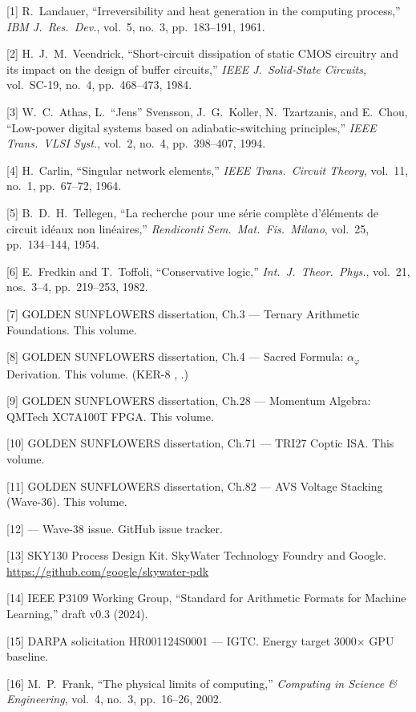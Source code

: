 [1] R.\ Landauer, ``Irreversibility and heat generation in the
computing process,'' \emph{IBM J.\ Res.\ Dev.}, vol.~5, no.~3,
pp.~183--191, 1961.

[2] H.\ J.\ M.\ Veendrick, ``Short-circuit dissipation of static
CMOS circuitry and its impact on the design of buffer circuits,''
\emph{IEEE J.\ Solid-State Circuits}, vol.~SC-19, no.~4,
pp.~468--473, 1984.

[3] W.\ C.\ Athas, L.\ ``Jens'' Svensson, J.\ G.\ Koller,
N.\ Tzartzanis, and E.\ Chou, ``Low-power digital systems based on
adiabatic-switching principles,'' \emph{IEEE Trans.\ VLSI Syst.},
vol.~2, no.~4, pp.~398--407, 1994.

[4] H.\ Carlin, ``Singular network elements,'' \emph{IEEE Trans.\
Circuit Theory}, vol.~11, no.~1, pp.~67--72, 1964.

[5] B.\ D.\ H.\ Tellegen, ``La recherche pour une s\'erie compl\`ete
d'\'el\'ements de circuit id\'eaux non lin\'eaires,''
\emph{Rendiconti Sem.\ Mat.\ Fis.\ Milano}, vol.~25, pp.~134--144,
1954.

[6] E.\ Fredkin and T.\ Toffoli, ``Conservative logic,''
\emph{Int.\ J.\ Theor.\ Phys.}, vol.~21, nos.~3--4, pp.~219--253,
1982.

[7] GOLDEN SUNFLOWERS dissertation, Ch.3 --- Ternary Arithmetic
Foundations. This volume.

[8] GOLDEN SUNFLOWERS dissertation, Ch.4 --- Sacred Formula:
\(\alpha_\varphi\) Derivation. This volume. (KER-8
, .)

[9] GOLDEN SUNFLOWERS dissertation, Ch.28 --- Momentum Algebra:
QMTech XC7A100T FPGA. This volume.

[10] GOLDEN SUNFLOWERS dissertation, Ch.71 --- TRI27 Coptic ISA.
This volume.

[11] GOLDEN SUNFLOWERS dissertation, Ch.82 --- AVS Voltage Stacking
(Wave-36). This volume.

[12]  --- Wave-38 issue. GitHub issue
tracker.

[13] SKY130 Process Design Kit. SkyWater Technology Foundry and
Google. \url{https://github.com/google/skywater-pdk}

[14] IEEE P3109 Working Group, ``Standard for Arithmetic Formats for
Machine Learning,'' draft v0.3 (2024).

[15] DARPA solicitation HR001124S0001 --- IGTC. Energy target
3000$\times$ GPU baseline.

[16] M.\ P.\ Frank, ``The physical limits of computing,''
\emph{Computing in Science \& Engineering}, vol.~4, no.~3,
pp.~16--26, 2002.

